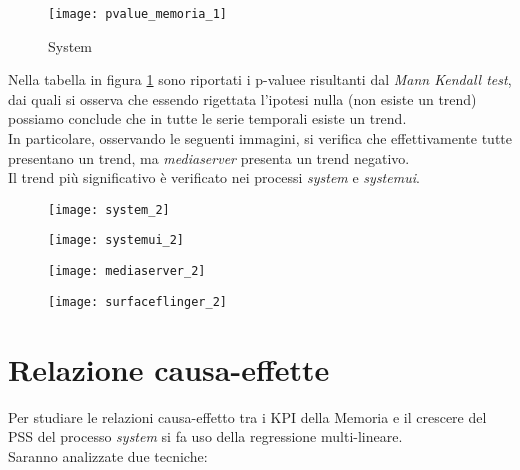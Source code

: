 \begin{figure}[!htbp]
  \centering
  \texttt{[image: pvalue\_memoria\_1]}
  \caption{System}
  \label{pvalue_memoria_1}
\end{figure}

Nella tabella in figura \ref{pvalue_memoria_1} sono riportati i p-valuee risultanti
dal \textit{Mann Kendall test}, dai quali si osserva che essendo rigettata l'ipotesi
nulla (non esiste un trend) possiamo conclude che in tutte le serie temporali
esiste un trend.\\
In particolare, osservando le seguenti immagini, si verifica che effettivamente
tutte presentano un trend, ma \textit{mediaserver} presenta un trend negativo.\\
Il trend più significativo è verificato nei processi \textit{system} e \textit{systemui}.

\begin{minipage}{\linewidth}
  \centering
  \begin{minipage}{0.49\linewidth}
    \begin{figure}[H]
      \texttt{[image: system\_2]}
    \end{figure}
  \end{minipage}
  \begin{minipage}{0.49\linewidth}
    \begin{figure}[H]
      \texttt{[image: systemui\_2]}
    \end{figure}
  \end{minipage}
  \begin{minipage}{0.49\linewidth}
    \begin{figure}[H]
      \texttt{[image: mediaserver\_2]}
    \end{figure}
  \end{minipage}
  \begin{minipage}{0.49\linewidth}
    \begin{figure}[H]
      \texttt{[image: surfaceflinger\_2]}
    \end{figure}
  \end{minipage}
\end{minipage}
\clearpage

\section{Relazione causa-effette}

Per studiare le relazioni causa-effetto tra i KPI della Memoria e il crescere
del PSS del processo \textit{system} si fa uso della regressione multi-lineare.\\
Saranno analizzate due tecniche:

